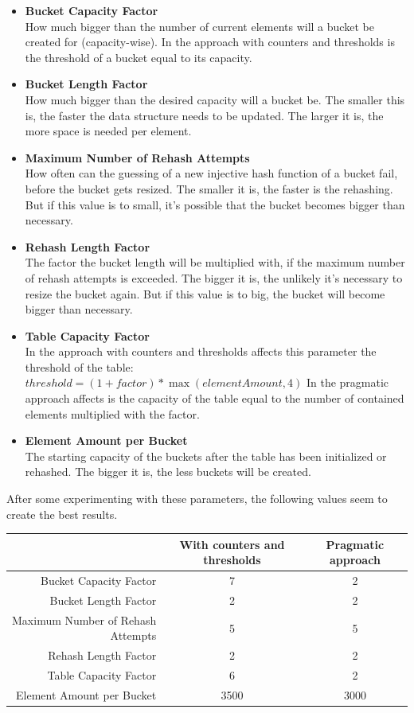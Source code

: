 \documentclass{article}
\begin{document}
\begin{itemize}
  \item \textbf{Bucket Capacity Factor}\\
  	How much bigger than the number of current elements will a bucket be created for (capacity-wise). In the approach with counters and thresholds is the threshold of a bucket equal to its capacity.
  \item \textbf{Bucket Length Factor}\\
    How much bigger than the desired capacity will a bucket be. The smaller this is, the faster the data structure needs to be updated. The larger it is, the more space is needed per element.
  \item \textbf{Maximum Number of Rehash Attempts}\\
  	How often can the guessing of a new injective hash function of a bucket fail, before the bucket gets resized. The smaller it is, the faster is the rehashing. But if this value is to small, it's possible that the bucket becomes bigger than necessary.
  \item \textbf{Rehash Length Factor}\\
    The factor the bucket length will be multiplied with, if the maximum number of rehash attempts is exceeded. The bigger it is, the unlikely it's necessary to resize the bucket again. But if this value is to big, the bucket will become bigger than necessary.
  \item \textbf{Table Capacity Factor}\\
    In the approach with counters and thresholds affects this parameter the threshold of the table: $ threshold = (1 + factor) * \max(elementAmount, 4) $
    In the pragmatic approach affects is the capacity of the table equal to the number of contained elements multiplied with the factor.
  \item \textbf{Element Amount per Bucket}\\
    The starting capacity of the buckets after the table has been initialized or rehashed. The bigger it is, the less buckets will be created.
\end{itemize}

After some experimenting with these parameters, the following values seem to create the best results.

\begin{center}
\begin{tabulary}{0.95\textwidth}{R|C|C}
& With counters \newline and thresholds & Pragmatic approach \\ 
\hline Bucket Capacity Factor & 7 & 2 \\ 
\hline Bucket Length Factor & 2 & 2 \\ 
\hline Maximum Number of Rehash Attempts & 5 & 5 \\ 
\hline Rehash Length Factor & 2 & 2 \\ 
\hline Table Capacity Factor & 6 & 2 \\ 
\hline Element Amount per Bucket & 3500 & 3000 \\
\end{tabulary}
\end{center}
\end{document}
